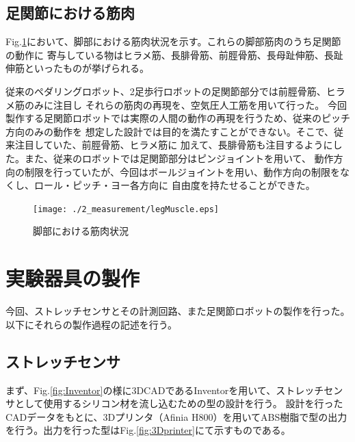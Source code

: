 \newpage

\subsection{足関節における筋肉}
Fig.\ref{fig:legMuscle}において、脚部における筋肉状況を示す。これらの脚部筋肉のうち足関節の動作に
寄与している物はヒラメ筋、長腓骨筋、前脛骨筋、長母趾伸筋、長趾伸筋といったものが挙げられる。

従来のペダリングロボット、2足歩行ロボットの足関節部分では前脛骨筋、ヒラメ筋のみに注目し
それらの筋肉の再現を、空気圧人工筋を用いて行った。
今回製作する足関節ロボットでは実際の人間の動作の再現を行うため、従来のピッチ方向のみの動作を
想定した設計では目的を満たすことができない。そこで、従来注目していた、前脛骨筋、ヒラメ筋に
加えて、長腓骨筋も注目するようにした。また、従来のロボットでは足関節部分はピンジョイントを用いて、
動作方向の制限を行っていたが、今回はボールジョイントを用い、動作方向の制限をなくし、ロール・ピッチ・ヨー各方向に
自由度を持たせることができた。
\begin{figure}[h]
    \begin{center}
     \texttt{[image: ./2\_measurement/legMuscle.eps]}
     \caption{脚部における筋肉状況}
     \label{fig:legMuscle}
    \end{center}
\end{figure}

\newpage

\section{実験器具の製作}
今回、ストレッチセンサとその計測回路、また足関節ロボットの製作を行った。以下にそれらの製作過程の記述を行う。
\subsection{ストレッチセンサ}
まず、Fig.\ref{fig:Inventor}の様に3DCADであるInventorを用いて、ストレッチセンサとして使用するシリコン材を流し込むための型の設計を行う。
設計を行ったCADデータをもとに、3Dプリンタ（Afinia H800）を用いてABS樹脂で型の出力を行う。出力を行った型はFig.\ref{fig:3Dprinter}にて示すものである。

